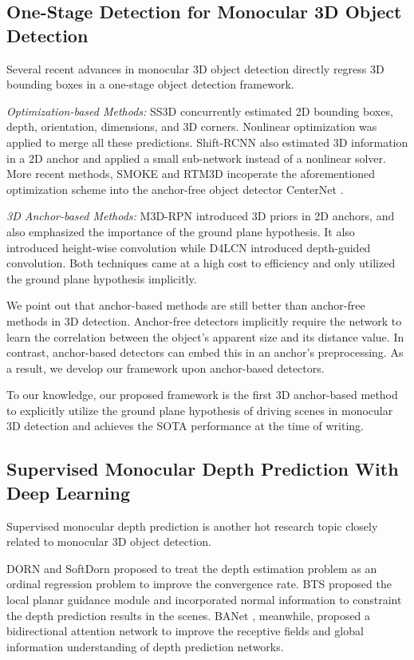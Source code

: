 \documentclass[letterpaper, 10 pt, journal, twoside]{IEEEtran}
\begin{document}
\subsection{One-Stage Detection for Monocular 3D Object Detection}
Several recent advances in monocular 3D object detection directly regress 3D bounding boxes in a one-stage object detection framework. 

\textit{Optimization-based Methods:}
SS3D \cite{Jorgensen2019SS3D} concurrently estimated 2D bounding boxes, depth, orientation, dimensions, and 3D corners. Nonlinear optimization was applied to merge all these predictions.
Shift-RCNN\cite{Li2019ShiftRCNN} also estimated 3D information in a 2D anchor and applied a small sub-network instead of a nonlinear solver.
More recent methods, SMOKE\cite{liu2020SMOKE} and RTM3D \cite{Li2020RTM3DRM} incoperate the aforementioned optimization scheme into the anchor-free object detector CenterNet \cite{zhou2019objects}.

\textit{3D Anchor-based Methods:}
M3D-RPN \cite{Brazil2019M3DRPN} introduced 3D priors in 2D anchors, and also emphasized the importance of the ground plane hypothesis.
It also introduced height-wise convolution while D4LCN \cite{Ding2019D4LCN} introduced depth-guided convolution.
Both techniques came at a high cost to efficiency and only utilized the ground plane hypothesis implicitly.

We point out that anchor-based methods are still better than anchor-free methods in 3D detection. Anchor-free detectors implicitly require the network to learn the correlation between the object's apparent size and its distance value. In contrast, anchor-based detectors can embed this in an anchor's preprocessing. As a result, we develop our framework upon anchor-based detectors.

To our knowledge, our proposed framework is the first 3D anchor-based method to explicitly utilize the ground plane hypothesis of driving scenes in monocular 3D detection and achieves the SOTA performance at the time of writing.

\subsection{Supervised Monocular Depth Prediction With Deep Learning}

Supervised monocular depth prediction is another hot research topic closely related to monocular 3D object detection. 

DORN \cite{Fu2018DORN} and SoftDorn \cite{diaz2019SoftDorn} proposed to treat the depth estimation problem as an ordinal regression problem to improve the convergence rate. BTS \cite{Lee2019BTS} proposed the local planar guidance module and incorporated normal information to constraint the depth prediction results in the scenes. BANet \cite{Aich2020BANet}, meanwhile, proposed a bidirectional attention network to improve the receptive fields and global information understanding of depth prediction networks. 
\end{document}
